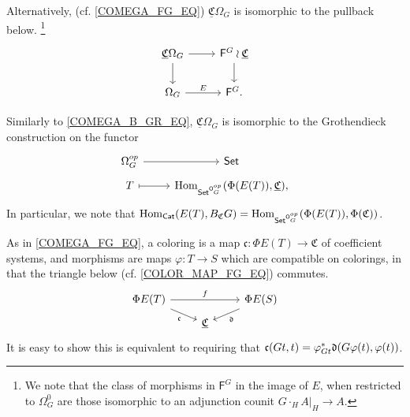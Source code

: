 \documentclass[a4paper,10pt
]{article}%
\renewcommand{\phi}{\varphi}
\newcommand{\UC}{\underline{\mathfrak C}}
\renewcommand{\1}{\ensuremath{\mathbb{id}}}
\begin{document}
\begin{remark}
      { \color{blue} %
        Alternatively, (cf. \eqref{COMEGA_FG_EQ})
        $\UC\Omega_G$ is isomorphic to the pullback below.
        \footnote{We note that the class of morphisms in $\mathsf F^G$ in the image of $E$, when restricted to $\Omega_G^0$
          are those isomorphic to an adjunction counit $G \cdot_H A|_H \to A$.}
        \begin{equation}
              \label{COMEGAG_FG_EQ}
              \begin{tikzcd}
                    \UC \Omega_G \arrow[d] \arrow[r]
                    &
                    \mathsf F^G \wr \underline{\mathfrak C} \arrow[d]
                    \\
                    \Omega_G \arrow[r, "E"]
                    &
                    \mathsf F^G.
              \end{tikzcd}
        \end{equation}
        
        Similarly to \eqref{COMEGA_B_GR_EQ}, $\underline{\mathfrak C}\Omega_G$ is isomorphic to the Grothendieck construction on the functor
        \begin{equation}
              \begin{tikzcd}[row sep = tiny]
                    \Omega_G^{op} \arrow[r]
                    &
                    \mathsf{Set}
                    \\
                    T \arrow[r, mapsto]
                    &
                    \Hom_{\Set^{\mathsf O_G^{op}}}(\Phi(E(T)), \underline{\mathfrak C}),
              \end{tikzcd}
        \end{equation}
        In particular, we note that
        $\operatorname{Hom}_{\mathsf{Cat}}(E(T), B_{\mathfrak C} G) = \operatorname{Hom}_{\mathsf{Set}^{\mathsf O_G^{op}}}(\Phi(E(T)), \Phi(\mathfrak C))$. 
        
        
        As in \eqref{COMEGA_FG_EQ}, a coloring is a map $\mathfrak c: \Phi E(T) \to \mathfrak C$ of coefficient systems,
        and morphisms are maps $\phi: T \to S$ which are compatible on colorings,
        in that the triangle below  (cf. \eqref{COLOR_MAP_FG_EQ}) commutes.
        \begin{equation}
              \begin{tikzcd}[row sep = tiny]
                    \Phi E(T) \arrow[rr, "f"] \arrow[dr, "\mathfrak c"']
                    &&
                    \Phi E(S) \arrow[dl, "\mathfrak d"]
                    \\
                    &
                    \underline{\mathfrak C}
              \end{tikzcd}
        \end{equation}
        It is easy to show this is equivalent to requiring that
        $\mathfrak c(G t, t) = \phi_{G t}^{\**} \mathfrak d(G \phi(t), \phi(t))$. 
        
}
\end{remark}
\end{document}

